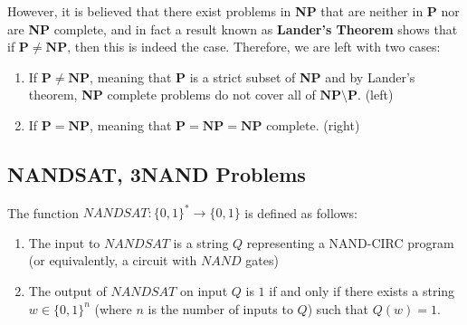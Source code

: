   However, it is believed that there exist problems in \textbf{NP} that are neither in \textbf{P} nor are \textbf{NP} complete, and in fact a result known as \textbf{Lander's Theorem} shows that if $\mathbf{P \neq NP}$, then this is indeed the case. Therefore, we are left with two cases:
  \begin{enumerate}
      \item If $\mathbf{P} \neq \mathbf{NP}$, meaning that \textbf{P} is a strict subset of \textbf{NP} and by Lander's theorem, \textbf{NP} complete problems do not cover all of $\mathbf{NP} \setminus \mathbf{P}$. (left)
      \item If $\mathbf{P} = \mathbf{NP}$, meaning that $\mathbf{P} = \mathbf{NP} = \mathbf{NP}$ complete. (right)
  \end{enumerate}
  \begin{center}
  \end{center}

\subsection{NANDSAT, 3NAND Problems}

  \begin{definition}
    \label{def:the-nandsat-problem}
  The function $NANDSAT: \{0,1\}^* \to \{0,1\}$ is defined as follows: 
  \begin{enumerate}
      \item The input to $NANDSAT$ is a string $Q$ representing a NAND-CIRC program (or equivalently, a circuit with $NAND$ gates)
      \item The output of $NANDSAT$ on input $Q$ is $1$ if and only if there exists a string $w \in \{0,1\}^n$ (where $n$ is the number of inputs to $Q$) such that $Q(w) = 1$. 
  \end{enumerate}
  \end{definition}

